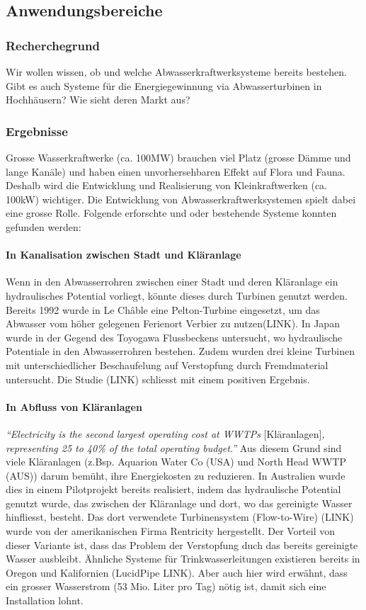 \subsection{Anwendungsbereiche}
\subsubsection{Recherchegrund}
Wir wollen wissen, ob und welche Abwasserkraftwerksysteme bereits bestehen. Gibt es auch Systeme für die Energiegewinnung via Abwasserturbinen in Hochhäusern? Wie sieht deren Markt aus?
\subsubsection{Ergebnisse}
Grosse Wasserkraftwerke (ca. 100\si{MW}) brauchen viel Platz (grosse Dämme und lange Kanäle) und haben einen unvorhersehbaren Effekt auf Flora und Fauna. Deshalb wird die Entwicklung und Realisierung von Kleinkraftwerken (ca. 100\si{kW}) wichtiger. Die Entwicklung von Abwasserkraftwerksystemen spielt dabei eine grosse Rolle. Folgende erforschte und oder bestehende Systeme konnten gefunden werden:
\paragraph{In Kanalisation zwischen Stadt und Kläranlage}
Wenn in den Abwasserrohren zwischen einer Stadt und deren Kläranlage ein hydraulisches Potential vorliegt, könnte dieses durch Turbinen genutzt werden. Bereits 1992 wurde in Le Châble eine Pelton-Turbine eingesetzt, um das Abwasser vom höher gelegenen Ferienort Verbier zu nutzen(LINK). In Japan wurde in der Gegend des Toyogawa Flussbeckens untersucht, wo hydraulische Potentiale in den Abwasserrohren bestehen. Zudem wurden drei kleine Turbinen mit unterschiedlicher Beschaufelung auf Verstopfung durch Fremdmaterial untersucht. Die Studie (LINK) schliesst mit einem positiven Ergebnis.
\paragraph{In Abfluss von Kläranlagen}
\textit{``Electricity is the second largest operating cost at WWTPs} [Kläranlagen]\textit{, representing 25 to 40\% of the total operating budget.''}
Aus diesem Grund sind viele Kläranlagen (z.Bsp. Aquarion Water Co (USA) und North Head WWTP (AUS)) darum bemüht, ihre Energiekosten zu reduzieren. In Australien wurde dies in einem Pilotprojekt bereits realisiert, indem das hydraulische Potential genutzt wurde, das zwischen der Kläranlage und dort, wo das gereinigte Wasser hinfliesst, besteht. Das dort verwendete Turbinensystem (Flow-to-Wire) (LINK) wurde von der amerikanischen Firma Rentricity hergestellt. Der Vorteil von dieser Variante ist, dass das Problem der Verstopfung duch das bereits gereinigte Wasser ausbleibt.
Ähnliche Systeme für Trinkwasserleitungen existieren bereits in Oregon und Kalifornien (LucidPipe LINK). Aber auch hier wird erwähnt, dass ein grosser Wasserstrom (53 Mio. Liter pro Tag) nötig ist, damit sich eine Installation lohnt.
